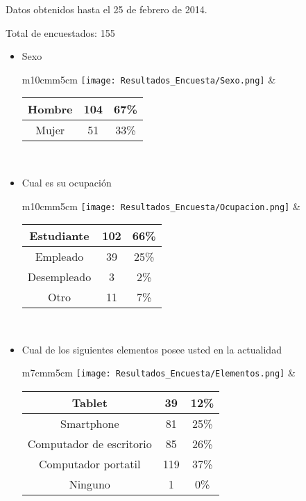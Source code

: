 \begin{center}
Datos obtenidos hasta el 25 de febrero de 2014.
\end{center}
Total de encuestados: 155
\begin{itemize}
  \item Sexo \\
      \begin{tabular}{m{10cm}m{5cm}}
        \texttt{[image: Resultados\_Encuesta/Sexo.png]} &
        \begin{tabular}{|c|cc|}
        \hline
         Hombre & 104 & 67\% \\ \hline
         Mujer & 51 &  33\%\\ \hline 
        \end{tabular} \\
      \end{tabular}
  \item Cual es su ocupación \\
      \begin{tabular}{m{10cm}m{5cm}}
        \texttt{[image: Resultados\_Encuesta/Ocupacion.png]} &
        \begin{tabular}{|c|cc|}
        \hline
         Estudiante & 102 & 66\% \\ \hline
         Empleado & 39 & 25\% \\ \hline 
         Desempleado & 3 & 2\% \\ \hline
         Otro & 11 & 7\% \\ \hline
        \end{tabular} \\
      \end{tabular}
  \item Cual de los siguientes elementos posee usted en la actualidad \\
      \begin{tabular}{m{7cm}m{5cm}}
        \texttt{[image: Resultados\_Encuesta/Elementos.png]} &
        \begin{tabular}{|c|cc|}
        \hline
         Tablet & 39 & 12\% \\ \hline
         Smartphone & 81 & 25\% \\ \hline
         Computador de escritorio & 85 & 26\% \\ \hline
         Computador portatil & 119 & 37\% \\ \hline
         Ninguno & 1 & 0\% \\ \hline
        \end{tabular} \\

\end{tabular}
\end{itemize}
